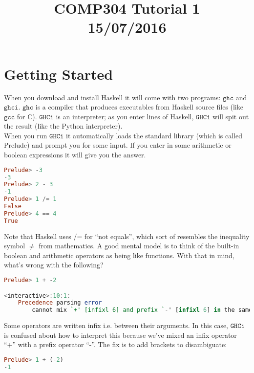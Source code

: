 \documentclass[a4paper,12pt]{article}
\newcommand{\keywadj}[1]{\mathtt{#1}}
\begin{document}
\title{COMP304 Tutorial 1 \\ 15/07/2016}
\date{}
\maketitle

\noindent
\section{Getting Started}
When you download and install Haskell it will come with two programs: $\keywadj{ghc}$ and $\keywadj{ghci}$. $\keywadj{ghc}$ is a compiler that produces executables from Haskell source files (like $\keywadj{gcc}$ for C). $\keywadj{GHCi}$ is an interpreter; as you enter lines of Haskell, $\keywadj{GHCi}$ will spit out the result (like the Python interpreter). \\

\noindent
When you run $\keywadj{GHCi}$ it automatically loads the standard library (which is called Prelude) and prompt you for some input. If you enter in some arithmetic or boolean expressions it will give you the answer.

\begin{lstlisting}[language=Haskell]
Prelude> -3
-3
Prelude> 2 - 3
-1
Prelude> 1 /= 1
False
Prelude> 4 == 4
True
\end{lstlisting}

\noindent
Note that Haskell uses /= for ``not equals'', which sort of resembles the inequality symbol $\neq$ from mathematics. A good mental model is to think of the built-in boolean and arithmetic operators as being like functions. With that in mind, what's wrong with the following?

\begin{lstlisting}[language=Haskell]
Prelude> 1 + -2

<interactive>:10:1:
    Precedence parsing error
        cannot mix `+' [infixl 6] and prefix `-' [infixl 6] in the same infix expression
\end{lstlisting}

\noindent
Some operators are written infix i.e. between their arguments. In this case, $\keywadj{GHCi}$ is confused about how to interpret this because we've mixed an infix operator ``+'' with a prefix operator ``-''. The fix is to add brackets to disambiguate:

\begin{lstlisting}[language=Haskell]
Prelude> 1 + (-2)
-1
\end{lstlisting}
\end{document}
